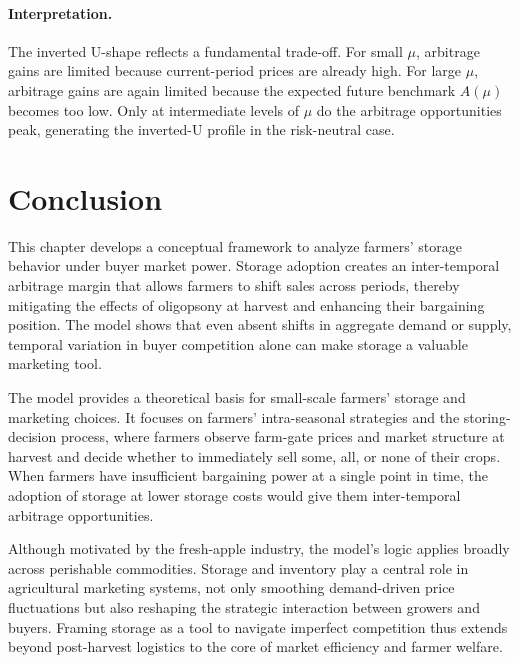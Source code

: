 \paragraph{Interpretation.}  
The inverted U-shape reflects a fundamental trade-off. For small $\mu$, arbitrage gains are limited because current-period prices are already high. For large $\mu$, arbitrage gains are again limited because the expected future benchmark $A(\mu)$ becomes too low. Only at intermediate levels of $\mu$ do the arbitrage opportunities peak, generating the inverted-U profile in the risk-neutral case.






\section{Conclusion}

\noindent This chapter develops a conceptual framework to analyze farmers' storage behavior under buyer market power. Storage adoption creates an inter-temporal arbitrage margin that allows farmers to shift sales across periods, thereby mitigating the effects of oligopsony at harvest and enhancing their bargaining position. The model shows that even absent shifts in aggregate demand or supply, temporal variation in buyer competition alone can make storage a valuable marketing tool.

The model provides a theoretical basis for small-scale farmers' storage and marketing choices. It focuses on farmers' intra-seasonal strategies and the storing-decision process, where farmers observe farm-gate prices and market structure at harvest and decide whether to immediately sell some, all, or none of their crops. When farmers have insufficient bargaining power at a single point in time, the adoption of storage at lower storage costs would give them inter-temporal arbitrage opportunities.

Although motivated by the fresh-apple industry, the model's logic applies broadly across perishable commodities. Storage and inventory play a central role in agricultural marketing systems, not only smoothing demand-driven price fluctuations but also reshaping the strategic interaction between growers and buyers. Framing storage as a tool to navigate imperfect competition thus extends beyond post-harvest logistics to the core of market efficiency and farmer welfare.

